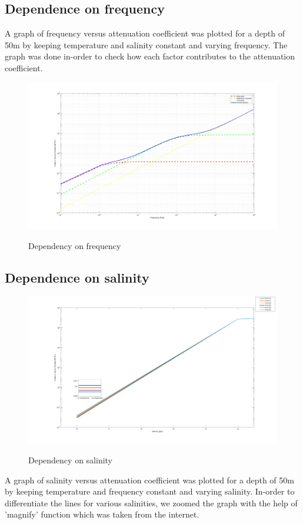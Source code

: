 \subsection{Dependence on frequency} \label{Dependence on frequency} 
\noindent A graph of frequency versus attenuation coefficient was plotted for a depth of 50m by keeping temperature and salinity constant and varying frequency. The graph was done in-order to check how each factor contributes to the attenuation coefficient.
\begin{figure}[H]
\centering
{\includegraphics[scale=0.15]{ucp2_2.png}}
\caption{Dependency on frequency}
\end{figure}

\subsection{Dependence on salinity} \label{Dependence on salinity} 

\begin{figure}[H]
\centering
{\includegraphics[scale=0.15]{ucp2_3.png}}
\caption{Dependency on salinity}
\end{figure}
\noindent A graph of salinity versus attenuation coefficient was plotted for a depth of 50m by keeping temperature and frequency constant and varying salinity. In-order to differentiate the lines for various salinities, we zoomed the graph with the help of 'magnify' function which was taken from the internet.

